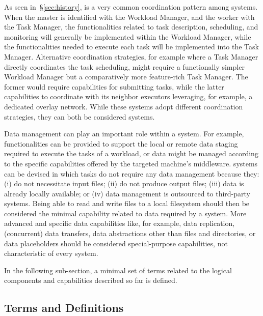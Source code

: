 \documentclass{sig-alternate}
\begin{document}
As seen in~\S\ref{sec:history}, \MW is a very common coordination pattern among
\pilotjob systems. When the master is identified with the Workload Manager, and
the worker with the Task Manager, the functionalities related to task
description, scheduling, and monitoring will generally be implemented within the
Workload Manager, while the functionalities needed to execute each task will be
implemented into the Task Manager. Alternative coordination strategies, for
example where a Task Manager directly coordinates the task scheduling, might
require a functionally simpler Workload Manager but a comparatively more
feature-rich Task Manager. The former would require capabilities for submitting
tasks, while the latter capabilities to coordinate with its neighbor executors
leveraging, for example, a dedicated overlay network. While these systems adopt
different coordination strategies, they can both be considered \pilotjob
systems.

Data management can play an important role within a \pilotjob system. For
example, functionalities can be provided to support the local or remote data
staging required to execute the tasks of a workload, or data might be managed
according to the specific capabilities offered by the targeted machine's
middleware. \pilotjob systems can be devised in which tasks do not require any
data management because they: (i) do not necessitate input files; (ii) do not
produce output files; (iii) data is already locally available; or (iv) data
management is outsourced to third-party systems. Being able to read and write
files to a local filesystem should then be considered the minimal capability
related to data required by a \pilotjob system. More advanced and specific data
capabilities like, for example, data replication, (concurrent) data transfers,
data abstractions other than files and directories, or data placeholders should
be considered special-purpose capabilities, not characteristic of every
\pilotjob system.

In the following sub-section, a minimal set of terms related to the logical
components and capabilities described so far is defined.

\subsection{Terms and Definitions}
\label{sec:termsdefs}
\end{document}
